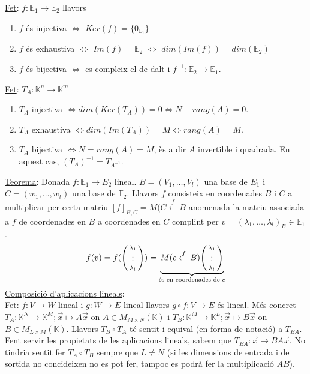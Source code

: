 \documentclass[../main.tex]{subfiles}
\begin{document}
    \underline{Fet}: $f: \mathbb{E}_1 \rightarrow \mathbb{E}_2$ llavors
    \begin{enumerate}
        \item $f$ és injectiva $\Longleftrightarrow$ $Ker(f) = \{0_{\mathbb{E}_1}\}$
        \item $f$ és exhaustiva $\Longleftrightarrow$ $Im(f) = \mathbb{E}_2$ $\Longleftrightarrow$ $dim(Im(f)) = dim(\mathbb{E}_2)$
        \item $f$ és bijectiva $\Longleftrightarrow$ es compleix el de dalt i $f^{-1}: \mathbb{E}_2 \rightarrow \mathbb{E}_1$.
    \end{enumerate}
    \underline{Fet}: $T_A: \mathbb{K}^n \rightarrow \mathbb{K}^m$
    \begin{enumerate}
        \item $T_A$ injectiva $\Longleftrightarrow dim(Ker(T_A)) = 0 \Longleftrightarrow N-rang(A) = 0$.
        \item $T_A$ exhaustiva $\Longleftrightarrow dim(Im(T_A)) = M \Longleftrightarrow rang(A) = M$.
        \item $T_A$ bijectiva $\Longleftrightarrow N = rang(A) = M$, ès a dir $A$ invertible i quadrada. En aquest cas, $(T_A)^{-1} = T_{A^{-1}}$.
    \end{enumerate}
    \underline{Teorema}: Donada $f: \mathbb{E}_1 \rightarrow E_2$ lineal. $B = (V_1, \dots, V_l)$ una base de $E_1$ i $C = (w_1, \dots, w_t)$ una base de $\mathbb{E}_2$. Llavors $f$ consisteix en coordenades $B$ i $C$ a multiplicar per certa matriu $[f]_{B, C} = M(C\xleftarrow{f} B$ anomenada la matriu associada a $f$ de coordenades en $B$ a coordenades en $C$ complint per $v = (\lambda_1, \dots, \lambda_l)_B \in \mathbb{E}_1$.\\
    \begin{displaymath}
    f(v) = f(\begin{psmallmatrix}
    \lambda_1 \\
    \vdots \\
    \lambda_l
    \end{psmallmatrix}) = \underbrace{M(c \xleftarrow{f} B)\begin{psmallmatrix}\lambda_1\\ \vdots \\ \lambda_l \end{psmallmatrix}}_{\text{és en coordenades de }  c}
    \end{displaymath}
    \underline{Composició d'aplicacions lineals}:\\
    Fet: $f: V \rightarrow W$ lineal i $g: W \longrightarrow E$ lineal llavors $g \circ f: V \longrightarrow E$ és lineal. Més concret $T_A: \mathbb{K}^N \longrightarrow \mathbb{K}^M; \vec{x} \longmapsto A\vec{x}$ on $A \in M_{M\times N}(\mathbb{K})$ i $T_B: \mathbb{K}^M \longrightarrow \mathbb{K}^L; \vec{x} \longmapsto B\vec{x}$ on $B \in M_{L\times M}(\mathbb{K})$. Llavors $T_B \circ T_A$ té sentit i equival (en forma de notació) a $T_{BA}$. Fent servir les propietats de les aplicacions lineals, sabem que $T_{BA}: \vec{x} \longmapsto BA\vec{x}$. No tindria sentit fer $T_A \circ T_B$ sempre que $L \neq N$ (si les dimensions de entrada i de sortida no concideixen no es pot fer, tampoc es podrà fer la multiplicació $AB$).\\
\end{document}
